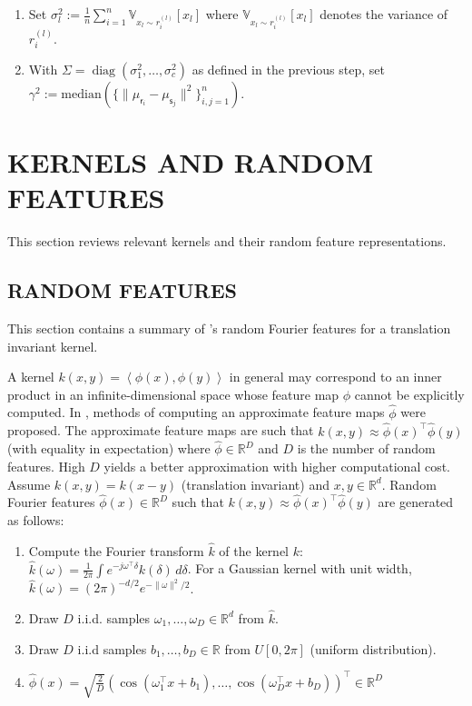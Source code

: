 \documentclass[english]{article}
\theoremstyle{plain}
\theoremstyle{plain}
\newcommand{\diag}{\mathop{\mathrm{diag}}}
\begin{document}
\begin{enumerate}
    \item Set $\sigma_l^2 := \frac{1}{n} \sum_{i=1}^n \mathbb{V}_{x_l \sim
            r_i^{(l)}}[x_l]$ where $ \mathbb{V}_{x_l \sim
                r_i^{(l)}}[x_l]$ denotes the variance of $r_i^{(l)}$.
            \item With $\Sigma = \diag(\sigma^2_1, \ldots, \sigma^2_c)$ as defined 
                in the previous step, set $\gamma^2 := \mathrm{median}\left( \{ \| \mu_{\mathsf{r}_i}
                - \mu_{\mathsf{s}_j}\|^2\}_{i,j=1}^n \right)$.
\end{enumerate}


\section{KERNELS AND RANDOM FEATURES}
\label{sec:kernel_random_features}

This section reviews relevant kernels and their random feature representations.

\subsection{RANDOM FEATURES}

This section contains a summary of 's random
Fourier features for a translation invariant kernel. 

A kernel $k(x,y)=\left\langle \phi(x),\phi(y)\right\rangle $ in general
may correspond to an inner product in an infinite-dimensional space
whose feature map $\phi$ cannot be explicitly computed. In ,
methods of computing an approximate feature maps $\hat{\phi}$ were
proposed. The approximate feature maps are such that $k(x,y)\approx\hat{\phi}(x)^{\top}\hat{\phi}(y)$
(with equality in expectation) where $\hat{\phi}\in\mathbb{R}^{D}$
and $D$ is the number of random features. High $D$ yields a better
approximation with higher computational cost. Assume $k(x,y)=k(x-y)$ (translation invariant)
and $x,y\in\mathbb{R}^{d}$. Random Fourier features $\hat{\phi}(x)\in\mathbb{R}^{D}$
such that $k(x,y)\approx\hat{\phi}(x)^{\top}\hat{\phi}(y)$ are generated
as follows:
\begin{enumerate}
\item Compute the Fourier transform $\hat{k}$ of the kernel $k$: $\hat{k}(\omega)=\frac{1}{2\pi}\int e^{-j\omega^{\top}\delta}k(\delta)\, d\delta$.
For a Gaussian kernel with unit width, $\hat{k}(\omega)=\left(2\pi\right)^{-d/2}e^{-\|\omega\|^{2}/2}$.
\item Draw $D$ i.i.d. samples $\omega_{1},\ldots,\omega_{D}\in\mathbb{R}^{d}$
from $\hat{k}$. 
\item Draw $D$ i.i.d samples $b_{1},\ldots,b_{D}\in\mathbb{R}$ from $U[0,2\pi]$
(uniform distribution).
\item $\hat{\phi}(x)=\sqrt{\frac{2}{D}}\left(\cos\left(\omega_{1}^{\top}x+b_{1}\right),\ldots,\cos\left(\omega_{D}^{\top}x+b_{D}\right)\right)^{\top}\in\mathbb{R}^{D}$
\end{enumerate}
\end{document}
